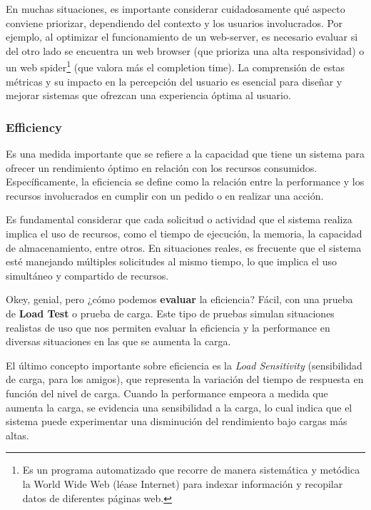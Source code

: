 \documentclass{article}
\begin{document}
 		En muchas situaciones, es importante considerar cuidadosamente qué aspecto conviene priorizar, dependiendo del contexto y los usuarios involucrados. Por ejemplo, al optimizar el funcionamiento de un web-server, es necesario evaluar si del otro lado se encuentra un web browser (que prioriza una alta responsividad) o un web spider\footnote{Es un programa automatizado que recorre de manera sistemática y metódica la World Wide Web (léase Internet) para indexar información y recopilar datos de diferentes páginas web.} (que valora más el completion time). La comprensión de estas métricas y su impacto en la percepción del usuario es esencial para diseñar y mejorar sistemas que ofrezcan una experiencia óptima al usuario.

 		
		\subsubsection{Efficiency}
		
		Es una medida importante que se refiere a la capacidad que tiene un sistema para ofrecer un rendimiento óptimo en relación con los recursos consumidos. Específicamente, la eficiencia se define como la relación entre la performance y los recursos involucrados en cumplir con un pedido o en realizar una acción.
		
		Es fundamental considerar que cada solicitud o actividad que el sistema realiza implica el uso de recursos, como el tiempo de ejecución, la memoria, la capacidad de almacenamiento, entre otros. En situaciones reales, es frecuente que el sistema esté manejando múltiples solicitudes al mismo tiempo, lo que implica el uso simultáneo y compartido de recursos.
		
		Okey, genial, pero ¿cómo podemos \textbf{evaluar} la eficiencia? Fácil, con una prueba de \textbf{Load Test} o prueba de carga. Este tipo de pruebas simulan situaciones realistas de uso que nos permiten evaluar la eficiencia y la performance en diversas situaciones en las que se aumenta la carga.
		
		El último concepto importante sobre eficiencia es la \textit{Load Sensitivity} ({\small sensibilidad de carga, para los amigos}), que representa la variación del tiempo de respuesta en función del nivel de carga. Cuando la performance empeora a medida que aumenta la carga, se evidencia una sensibilidad a la carga, lo cual indica que el sistema puede experimentar una disminución del rendimiento bajo cargas más altas.
		
		
		
\end{document}
